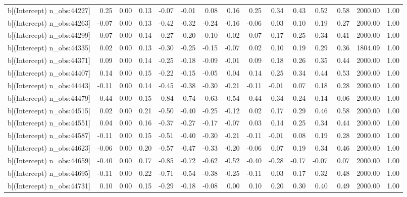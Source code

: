 \begin{table}[ht]
\begin{tabular}{rrrrrrrrrrrrrrr}
  b[(Intercept) n\_obs:44227] & 0.25 & 0.00 & 0.13 & -0.07 & -0.01 & 0.08 & 0.16 & 0.25 & 0.34 & 0.43 & 0.52 & 0.58 & 2000.00 & 1.00 \\ 
  b[(Intercept) n\_obs:44263] & -0.07 & 0.00 & 0.13 & -0.42 & -0.32 & -0.24 & -0.16 & -0.06 & 0.03 & 0.10 & 0.19 & 0.27 & 2000.00 & 1.00 \\ 
  b[(Intercept) n\_obs:44299] & 0.07 & 0.00 & 0.14 & -0.27 & -0.20 & -0.10 & -0.02 & 0.07 & 0.17 & 0.25 & 0.34 & 0.41 & 2000.00 & 1.00 \\ 
  b[(Intercept) n\_obs:44335] & 0.02 & 0.00 & 0.13 & -0.30 & -0.25 & -0.15 & -0.07 & 0.02 & 0.10 & 0.19 & 0.29 & 0.36 & 1804.09 & 1.00 \\ 
  b[(Intercept) n\_obs:44371] & 0.09 & 0.00 & 0.14 & -0.25 & -0.18 & -0.09 & -0.01 & 0.09 & 0.18 & 0.26 & 0.35 & 0.44 & 2000.00 & 1.00 \\ 
  b[(Intercept) n\_obs:44407] & 0.14 & 0.00 & 0.15 & -0.22 & -0.15 & -0.05 & 0.04 & 0.14 & 0.25 & 0.34 & 0.44 & 0.53 & 2000.00 & 1.00 \\ 
  b[(Intercept) n\_obs:44443] & -0.11 & 0.00 & 0.14 & -0.45 & -0.38 & -0.30 & -0.21 & -0.11 & -0.01 & 0.07 & 0.18 & 0.28 & 2000.00 & 1.00 \\ 
  b[(Intercept) n\_obs:44479] & -0.44 & 0.00 & 0.15 & -0.84 & -0.74 & -0.63 & -0.54 & -0.44 & -0.34 & -0.24 & -0.14 & -0.06 & 2000.00 & 1.00 \\ 
  b[(Intercept) n\_obs:44515] & 0.02 & 0.00 & 0.21 & -0.50 & -0.40 & -0.25 & -0.12 & 0.02 & 0.17 & 0.29 & 0.46 & 0.58 & 2000.00 & 1.00 \\ 
  b[(Intercept) n\_obs:44551] & 0.04 & 0.00 & 0.16 & -0.37 & -0.27 & -0.17 & -0.07 & 0.03 & 0.14 & 0.25 & 0.34 & 0.44 & 2000.00 & 1.00 \\ 
  b[(Intercept) n\_obs:44587] & -0.11 & 0.00 & 0.15 & -0.51 & -0.40 & -0.30 & -0.21 & -0.11 & -0.01 & 0.08 & 0.19 & 0.28 & 2000.00 & 1.00 \\ 
  b[(Intercept) n\_obs:44623] & -0.06 & 0.00 & 0.20 & -0.57 & -0.47 & -0.33 & -0.20 & -0.06 & 0.07 & 0.19 & 0.34 & 0.46 & 2000.00 & 1.00 \\ 
  b[(Intercept) n\_obs:44659] & -0.40 & 0.00 & 0.17 & -0.85 & -0.72 & -0.62 & -0.52 & -0.40 & -0.28 & -0.17 & -0.07 & 0.07 & 2000.00 & 1.00 \\ 
  b[(Intercept) n\_obs:44695] & -0.11 & 0.00 & 0.22 & -0.71 & -0.54 & -0.38 & -0.25 & -0.11 & 0.03 & 0.17 & 0.32 & 0.48 & 2000.00 & 1.00 \\ 
  b[(Intercept) n\_obs:44731] & 0.10 & 0.00 & 0.15 & -0.29 & -0.18 & -0.08 & 0.00 & 0.10 & 0.20 & 0.30 & 0.40 & 0.49 & 2000.00 & 1.00 \\ 

\end{tabular}
\end{table}
